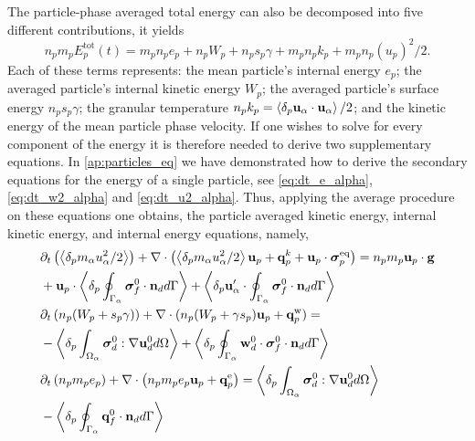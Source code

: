 The particle-phase averaged total energy can also be decomposed into five different contributions, it yields 
\begin{equation*}
    n_p m_p E_p^\text{tot}(t) 
    = m_p n_p e_p 
    + n_p W_p
    + n_p s_p \gamma
    + m_p n_p k_p
    + m_p n_p (u_p)^2/2. 
    \label{eq:E_p_def}
\end{equation*}
Each of these terms represents: 
the mean particle's internal energy $e_p$; 
the averaged particle's internal kinetic energy $W_p$;
the averaged particle's surface energy $n_p s_p \gamma$;
the granular temperature $n_p k_p =\left<\delta_p \textbf{u}_\alpha \cdot\textbf{u}_\alpha\right>/2$;
and the kinetic energy of the mean particle phase velocity. 
If one wishes to solve for every component of the energy it is therefore needed to derive two supplementary equations. 
In \ref{ap:particles_eq} we have demonstrated how to derive the secondary equations for the energy of a single particle, see  \ref{eq:dt_e_alpha}, \ref{eq:dt_w2_alpha} and \ref{eq:dt_u2_alpha}. 
Thus, applying the average procedure on these equations one obtains, the particle averaged kinetic energy, internal kinetic energy, and internal energy equations, namely,
\begin{align}
    &\pddt \left(\pavg{m_\alpha u_\alpha^2/2}\right)
    + \div \left(\pavg{m_\alpha u_\alpha^2/2} \textbf{u}_p 
    + \textbf{q}^k_p
    + \textbf{u}_p \cdot \bm{\sigma}_p^\text{eq}
    \right)
    = 
    n_p m_p \textbf{u}_p \cdot
    \textbf{g}\nonumber\\
    &+ \textbf{u}_p\cdot\pSavg{{\bm{\sigma}_f^0 \cdot \textbf{n}_d}}
    + \pavg{\textbf{u}_\alpha'\cdot\intS{\bm{\sigma}_f^0 \cdot \textbf{n}_d}}
    \label{eq:dt_hybrid_u2p}
    \\
    &\pddt \left(n_p (W_p + s_p\gamma)\right)
    + \div 
    (n_p (W_p + \gamma s_p)
    \textbf{u}_p 
    +  \textbf{q}_p^\text{w}
    )
    = \nonumber\\
    &- \pOavg{{\bm{\sigma}_d^0 : \grad\textbf{u}_d^0}}
    + \pSavg{{\textbf{w}_d^0 \cdot \bm{\sigma}_f^0 \cdot  \textbf{n}_d}}
    \label{eq:dt_hybrid_Wp}
    \\
    &\pddt \left(n_p m_p e_p\right)
    + \div \left(n_p
    m_p e_p \textbf{u}_p 
    +  \textbf{q}_p^\text{e}
    \right)
    = 
    \pOavg{{\bm{\sigma}_d^0 : \grad\textbf{u}_d^0}}\nonumber\\
    &- \pSavg{{\textbf{q}_f^0\cdot \textbf{n}_d}}
    \label{eq:dt_hybrid_ep}
\end{align}
